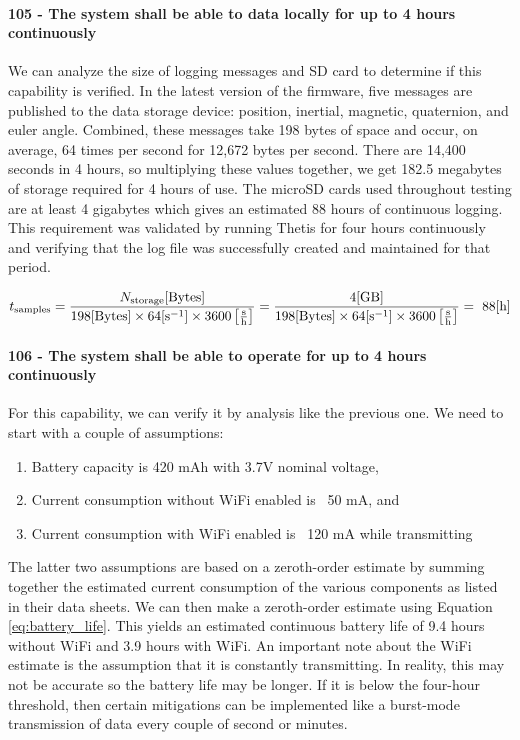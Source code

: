 \paragraph*{105 - The system shall be able to data locally for up to 4 hours continuously} We can analyze the size of logging messages and SD card to determine if this capability is verified.
In the latest version of the firmware, five messages are published to the data storage device: position, inertial, magnetic, quaternion, and euler angle.
Combined, these messages take 198 bytes of space and occur, on average, 64 times per second for 12,672 bytes per second.
There are 14,400 seconds in 4 hours, so multiplying these values together, we get 182.5 megabytes of storage required for 4 hours of use.
The microSD cards used throughout testing are at least 4 gigabytes which gives an estimated 88 hours of continuous logging.
This requirement was validated by running Thetis for four hours continuously and verifying that the log file was successfully created and maintained for that period.

\begin{equation} \labeq{storage_time}
    t_{\text{samples}} = \frac{N_{\text{storage}} [\text{Bytes}]}{198 [\text{Bytes}] \times 64 [\text{s}^{-1}] \times 3600 \left[\frac{\text{s}}{\text{h}}\right]} = \frac{4 [\text{GB}]}{198 [\text{Bytes}] \times 64 [\text{s}^{-1}] \times 3600 \left[\frac{\text{s}}{\text{h}}\right]} = ~88 [\text{h}]
\end{equation}

\paragraph*{106 - The system shall be able to operate for up to 4 hours continuously} For this capability, we can verify it by analysis like the previous one.
We need to start with a couple of assumptions:

\begin{enumerate}
    \item Battery capacity is 420 mAh with 3.7V nominal voltage,
    \item Current consumption without WiFi enabled is ~50 mA, and
    \item Current consumption with WiFi enabled is ~120 mA while transmitting
\end{enumerate}

The latter two assumptions are based on a zeroth-order estimate by summing together the estimated current consumption of the various components as listed in their data sheets.
We can then make a zeroth-order estimate using Equation \ref{eq:battery_life}.
This yields an estimated continuous battery life of 9.4 hours without WiFi and 3.9 hours with WiFi.
An important note about the WiFi estimate is the assumption that it is constantly transmitting.
In reality, this may not be accurate so the battery life may be longer.
If it is below the four-hour threshold, then certain mitigations can be implemented like a burst-mode transmission of data every couple of second or minutes.

